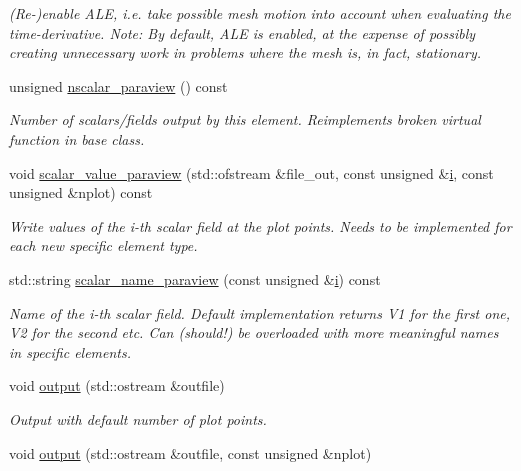 \begin{DoxyCompactItemize}
\begin{DoxyCompactList}\small\item\em (Re-\/)enable A\+LE, i.\+e. take possible mesh motion into account when evaluating the time-\/derivative. Note\+: By default, A\+LE is enabled, at the expense of possibly creating unnecessary work in problems where the mesh is, in fact, stationary. \end{DoxyCompactList}\item 
unsigned \hyperlink{classoomph_1_1AxisymAdvectionDiffusionEquations_a0015b0dfe81d34d01169a5e457751e06}{nscalar\+\_\+paraview} () const
\begin{DoxyCompactList}\small\item\em Number of scalars/fields output by this element. Reimplements broken virtual function in base class. \end{DoxyCompactList}\item 
void \hyperlink{classoomph_1_1AxisymAdvectionDiffusionEquations_aa39915ea1370a7785e8b046ab5660471}{scalar\+\_\+value\+\_\+paraview} (std\+::ofstream \&file\+\_\+out, const unsigned \&\hyperlink{cfortran_8h_adb50e893b86b3e55e751a42eab3cba82}{i}, const unsigned \&nplot) const
\begin{DoxyCompactList}\small\item\em Write values of the i-\/th scalar field at the plot points. Needs to be implemented for each new specific element type. \end{DoxyCompactList}\item 
std\+::string \hyperlink{classoomph_1_1AxisymAdvectionDiffusionEquations_aef90d6d8a1262ae8caab9cd571b61392}{scalar\+\_\+name\+\_\+paraview} (const unsigned \&\hyperlink{cfortran_8h_adb50e893b86b3e55e751a42eab3cba82}{i}) const
\begin{DoxyCompactList}\small\item\em Name of the i-\/th scalar field. Default implementation returns V1 for the first one, V2 for the second etc. Can (should!) be overloaded with more meaningful names in specific elements. \end{DoxyCompactList}\item 
void \hyperlink{classoomph_1_1AxisymAdvectionDiffusionEquations_ae8cc538907edda147270ae26696919bd}{output} (std\+::ostream \&outfile)
\begin{DoxyCompactList}\small\item\em Output with default number of plot points. \end{DoxyCompactList}\item 
void \hyperlink{classoomph_1_1AxisymAdvectionDiffusionEquations_a37f231fce2fd5b8bbe51899469b2896b}{output} (std\+::ostream \&outfile, const unsigned \&nplot)

\end{DoxyCompactItemize}
